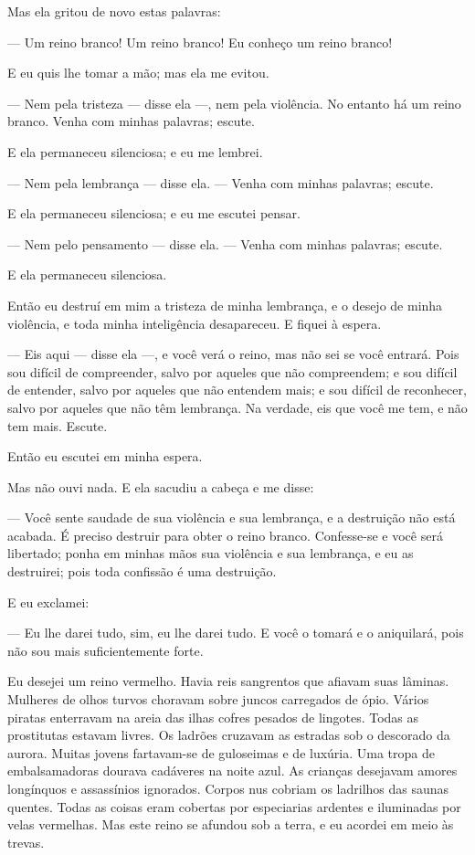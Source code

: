 Mas ela gritou de novo estas palavras:

--- Um reino branco! Um reino branco! Eu conheço um reino branco!

E eu quis lhe tomar a mão; mas ela me evitou.

--- Nem pela tristeza --- disse ela ---, nem pela violência. No entanto há um
reino branco. Venha com minhas palavras; escute.

E ela permaneceu silenciosa; e eu me lembrei.

--- Nem pela lembrança --- disse ela.  --- Venha com minhas palavras; escute.

E ela permaneceu silenciosa; e eu me escutei pensar.

--- Nem pelo pensamento --- disse ela. --- Venha com minhas palavras; escute.

E ela permaneceu silenciosa.

Então eu destruí em mim a tristeza de minha lembrança, e o desejo de
minha violência, e toda minha inteligência desapareceu. E fiquei à espera.

--- Eis aqui --- disse ela ---, e você verá o reino, mas não sei se você
entrará. Pois sou difícil de compreender, salvo por aqueles que não
compreendem; e sou difícil de entender, salvo por aqueles que não entendem
mais; e sou difícil de reconhecer, salvo por aqueles que não têm
lembrança. Na verdade, eis que você me tem, e não tem mais. Escute.

Então eu escutei em minha espera.

Mas não ouvi nada. E ela sacudiu a cabeça e me disse:

--- Você sente saudade de sua violência e sua lembrança, e a destruição
não está acabada. É preciso destruir para obter o reino branco.
Confesse-se e você será libertado; ponha em minhas mãos sua violência e
sua lembrança, e eu as destruirei; pois toda confissão é uma destruição.

E eu exclamei:

--- Eu lhe darei tudo, sim, eu lhe darei tudo. E você o tomará e o
aniquilará, pois não sou mais suficientemente forte.

Eu desejei um reino vermelho. Havia reis sangrentos que afiavam suas
lâminas. Mulheres de olhos turvos choravam sobre juncos carregados de ópio.
Vários piratas enterravam na areia das ilhas cofres pesados de lingotes.
Todas as prostitutas estavam livres. Os ladrões cruzavam as estradas sob o
descorado da aurora. Muitas jovens fartavam-se de guloseimas e de luxúria.
Uma tropa de embalsamadoras dourava cadáveres na noite azul. As crianças
desejavam amores longínquos e assassínios ignorados. Corpos nus cobriam os
ladrilhos das saunas quentes. Todas as coisas eram cobertas por
especiarias ardentes e iluminadas por velas vermelhas. Mas este reino se
afundou sob a terra, e eu acordei em meio às trevas.

